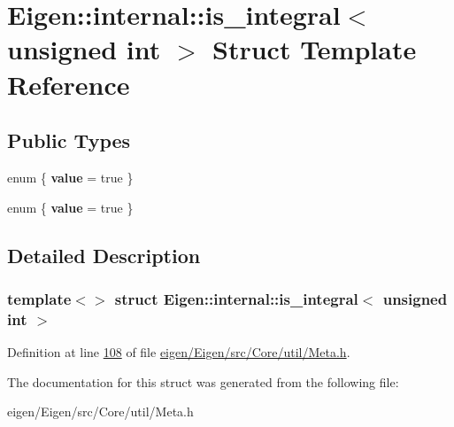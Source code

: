 \hypertarget{struct_eigen_1_1internal_1_1is__integral_3_01unsigned_01int_01_4}{}\section{Eigen\+:\+:internal\+:\+:is\+\_\+integral$<$ unsigned int $>$ Struct Template Reference}
\label{struct_eigen_1_1internal_1_1is__integral_3_01unsigned_01int_01_4}
\subsection*{Public Types}
\begin{DoxyCompactItemize}
\item 
\mbox{\label{struct_eigen_1_1internal_1_1is__integral_3_01unsigned_01int_01_4_a1129a5adc5760c92faca2d84fc3e09ef}} 
enum \{ {\bfseries value} = true
 \}
\item 
\mbox{\label{struct_eigen_1_1internal_1_1is__integral_3_01unsigned_01int_01_4_a9b08c03bdaef10dd3085fa5b3243a91b}} 
enum \{ {\bfseries value} = true
 \}
\end{DoxyCompactItemize}


\subsection{Detailed Description}
\subsubsection*{template$<$$>$\newline
struct Eigen\+::internal\+::is\+\_\+integral$<$ unsigned int $>$}



Definition at line \hyperlink{eigen_2_eigen_2src_2_core_2util_2_meta_8h_source_l00108}{108} of file \hyperlink{eigen_2_eigen_2src_2_core_2util_2_meta_8h_source}{eigen/\+Eigen/src/\+Core/util/\+Meta.\+h}.



The documentation for this struct was generated from the following file\+:\begin{DoxyCompactItemize}
\item 
eigen/\+Eigen/src/\+Core/util/\+Meta.\+h\end{DoxyCompactItemize}
